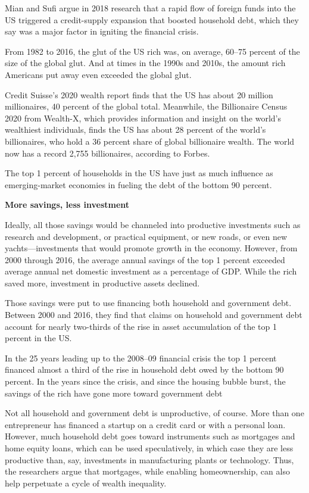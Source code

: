 \documentclass[
]{book}
\begin{document}
Mian and Sufi argue in 2018 research that a rapid flow of foreign funds into the US triggered a credit-supply expansion that boosted household debt, which they say was a major factor in igniting the financial crisis.

From 1982 to 2016, the glut of the US rich was, on average, 60--75 percent of the size of the global glut. And at times in the 1990s and 2010s, the amount rich Americans put away even exceeded the global glut.

Credit Suisse's 2020 wealth report finds that the US has about 20 million millionaires, 40 percent of the global total. Meanwhile, the Billionaire Census 2020 from Wealth-X, which provides information and insight on the world's wealthiest individuals, finds the US has about 28 percent of the world's billionaires, who hold a 36 percent share of global billionaire wealth. The world now has a record 2,755 billionaires, according to Forbes.

The top 1 percent of households in the US have just as much influence as emerging-market economies in fueling the debt of the bottom 90 percent.

\textbf{More savings, less investment}

Ideally, all those savings would be channeled into productive investments such as research and development, or practical equipment, or new roads, or even new yachts---investments that would promote growth in the economy. However, from 2000 through 2016, the average annual savings of the top 1 percent exceeded average annual net domestic investment as a percentage of GDP.
While the rich saved more, investment in productive assets declined.

Those savings were put to use financing both household and government debt.
Between 2000 and 2016, they find that claims on household and government debt account for nearly two-thirds of the rise in asset accumulation of the top 1 percent in the US.

In the 25 years leading up to the 2008--09 financial crisis the top 1 percent financed almost a third of the rise in household debt owed by the bottom 90 percent.
In the years since the crisis, and since the housing bubble burst, the savings of the rich have gone more toward government debt

Not all household and government debt is unproductive, of course. More than one entrepreneur has financed a startup on a credit card or with a personal loan. However, much household debt goes toward instruments such as mortgages and home equity loans, which can be used speculatively, in which case they are less productive than, say, investments in manufacturing plants or technology. Thus, the researchers argue that mortgages, while enabling homeownership, can also help perpetuate a cycle of wealth inequality.
\end{document}

